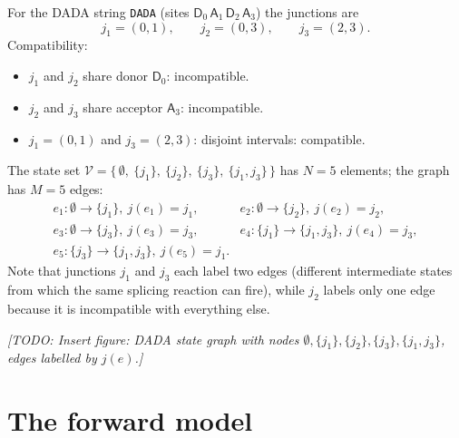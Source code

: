 \documentclass[11pt, a4paper]{article}
\newcommand{\todo}[1]{\textcolor{blue!70!black}{\textit{[TODO: #1]}}}
\begin{document}
For the DADA string \texttt{DADA} (sites $\textsf{D}_0\,\textsf{A}_1\,\textsf{D}_2\,\textsf{A}_3$) the junctions are
\[
j_1 = (0, 1), \qquad j_2 = (0, 3), \qquad j_3 = (2, 3).
\]
Compatibility:
\begin{itemize}[noitemsep, topsep=2pt]
  \item $j_1$ and $j_2$ share donor $\textsf{D}_0$: incompatible.
  \item $j_2$ and $j_3$ share acceptor $\textsf{A}_3$: incompatible.
  \item $j_1 = (0,1)$ and $j_3 = (2,3)$: disjoint intervals: compatible.
\end{itemize}
The state set $\mathcal{V} = \{\,\emptyset,\ \{j_1\},\ \{j_2\},\ \{j_3\},\ \{j_1, j_3\}\,\}$ has $N = 5$ elements; the graph has $M = 5$ edges:
\begin{align*}
e_1: \emptyset \to \{j_1\},\ j(e_1) = j_1, \quad &
e_2: \emptyset \to \{j_2\},\ j(e_2) = j_2, \\
e_3: \emptyset \to \{j_3\},\ j(e_3) = j_3, \quad &
e_4: \{j_1\} \to \{j_1, j_3\},\ j(e_4) = j_3, \\
e_5: \{j_3\} \to \{j_1, j_3\},\ j(e_5) = j_1. &
\end{align*}
Note that junctions $j_1$ and $j_3$ each label two edges (different intermediate states from which the same splicing reaction can fire), while $j_2$ labels only one edge because it is incompatible with everything else.

\todo{Insert figure: DADA state graph with nodes $\emptyset, \{j_1\}, \{j_2\}, \{j_3\}, \{j_1,j_3\}$, edges labelled by $j(e)$.}

\section{The forward model}
\label{sec:forward}
\end{document}
